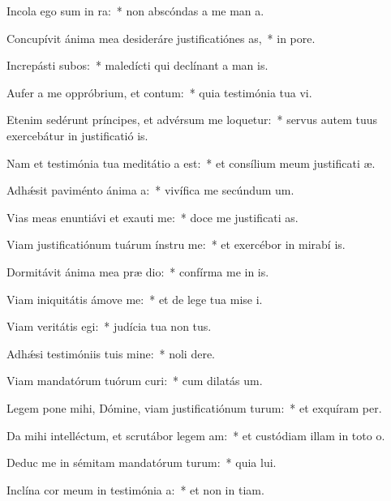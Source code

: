 \item Incola ego sum in ra:~* non abscóndas a me man a.
\item Concupívit ánima mea desideráre justificatiónes as,~* in  pore.
\item Increpásti subos:~* maledícti qui declínant a man is.
\item Aufer a me oppróbrium, et contum:~* quia testimónia tua vi.
\item Etenim sedérunt príncipes, et advérsum me loquetur:~* servus autem tuus exercebátur in justificatió is.
\item Nam et testimónia tua meditátio a est:~* et consílium meum justificati æ.
\item Adhǽsit paviménto ánima a:~* vivífica me secúndum  um.
\item Vias meas enuntiávi et exauti me:~* doce me justificati as.
\item Viam justificatiónum tuárum ínstru me:~* et exercébor in mirabí is.
\item Dormitávit ánima mea præ dio:~* confírma me in  is.
\item Viam iniquitátis ámove  me:~* et de lege tua mise i.
\item Viam veritátis egi:~* judícia tua non  tus.
\item Adhǽsi testimóniis tuis mine:~* noli  dere.
\item Viam mandatórum tuórum curi:~* cum dilatás  um.
\item Legem pone mihi, Dómine, viam justificatiónum turum:~* et exquíram  per.
\item Da mihi intelléctum, et scrutábor legem am:~* et custódiam illam in toto  o.
\item Deduc me in sémitam mandatórum turum:~* quia  lui.
\item Inclína cor meum in testimónia a:~* et non in tiam.

